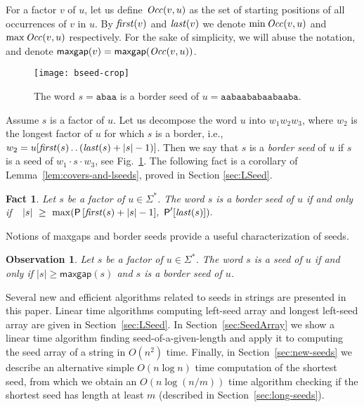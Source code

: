 \documentclass{llncs}
\newtheorem{fact}[lemma]{Fact}
\newtheorem{observation}[lemma]{Observation}
\newcommand{\Period}{\textsf{P}}
\newcommand{\firstocc}{\mbox{\textit{first}}}
\newcommand{\lastocc}{\mbox{\textit{last}}}
\newcommand{\Occ}{\mbox{\textit{Occ}}}
\newcommand{\maxgap}{\textsf{maxgap}}
\def\dotdot{\mathinner{\ldotp\ldotp}}
\begin{document}
    For a factor $v$ of $u$, let us define $\Occ(v,u)$ as the set of starting positions of all
    occurrences of $v$ in $u$.
    By $\firstocc(v)$ and $\lastocc(v)$ we denote $\min\Occ(v,u)$ and $\max \Occ(v,u)$ 
    respectively.
    For the sake of simplicity, we will abuse the notation, and denote
    $\maxgap(v) = \maxgap(\Occ(v,u))$.

\begin{figure}
  \begin{center}
    \texttt{[image: bseed-crop]}
  \end{center}
  \caption{\label{fig:border-seed}
    The word $s=\mathtt{abaa}$ is a border seed of $u=\mathtt{aabaababaabaaba}$.
  }
\end{figure}

    Assume $s$ is a factor of $u$.
    Let us decompose the word $u$ into $w_1w_2w_3$, where $w_2$ is the longest
    factor of $u$ for which $s$ is a border, i.e., 
    $w_2 = u[\firstocc(s) \dotdot (\lastocc(s)+|s|-1)]$.
    Then we say that $s$ is a \emph{border seed} of $u$ if $s$ is a seed of 
    $w_1\cdot s\cdot w_3$, see Fig.~\ref{fig:border-seed}.
    The following fact is a corollary of Lemma~\ref{lem:covers-and-lseeds}, 
    proved in Section \ref{sec:LSeed}.

    \begin{fact}\label{fact:border-seed}
      Let $s$ be a factor of $u \in \Sigma^*$.
      The word $s$ is a border seed of $u$ if and only if\ \ 
      $|s|\ \ge\ \max(\Period\,[\firstocc(s)+|s|-1],\ \Period'[\lastocc(s)]).$
    \end{fact}

    \smallskip
    \noindent
    Notions of maxgaps and border seeds provide a useful characterization of seeds.

    \begin{observation}\label{obs:maxgap-border-seed}
      Let $s$ be a factor of $u \in \Sigma^*$.
      The word $s$ is a seed of $u$ if and only if $|s| \ge \maxgap(s)$
      and $s$ is a border seed of $u$.
    \end{observation}

    \noindent
    Several new and efficient algorithms related to seeds in strings are presented in this paper.
    Linear time algorithms computing left-seed array and longest left-seed array are given
    in Section~\ref{sec:LSeed}.
    In Section~\ref{sec:SeedArray} we show a linear time algorithm finding seed-of-a-given-length
    and apply it to computing the seed array of a string in $O(n^2)$ time.
    Finally, in Section~\ref{sec:new-seeds} we describe an alternative simple $O(n\log{n})$ time computation
    of the shortest seed, from which we obtain an $O(n\log{(n/m)})$ time algorithm checking if
    the shortest seed has length at least $m$ (described in Section~\ref{sec:long-seeds}).
\end{document}
